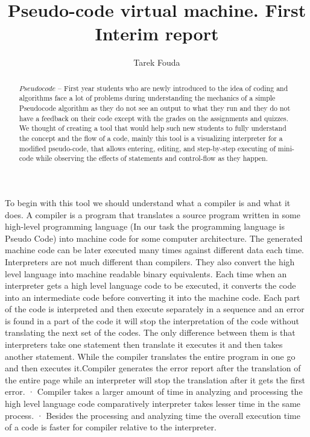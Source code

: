 \documentclass[a4paper]{article}
\author{Tarek Fouda}
\title{Pseudo-code virtual machine. First Interim report}
\begin{document}
\maketitle

\begin{abstract}
  $ Pseudo code $ -- First year students who are newly introduced to the idea of coding and algorithms face a lot of problems during understanding the mechanics of a simple Pseudocode algorithm as they do not see an output to what they run and they do not have a feedback on their code except with the grades on the assignments and quizzes. We thought of creating a tool that would help such new students to fully understand the concept and the flow of a code, mainly this tool is a visualizing interpreter for a modified pseudo-code, that allows entering, editing, and step-by-step executing of mini-code while observing the effects of statements and control-flow as they happen.
  
  
  \end{abstract}
  \bigskip
  \bigskip
  

To begin with this tool we should understand what a compiler is and what it does. A compiler is a program that translates a source program written in some high-level programming language (In our task the programming language is Pseudo Code) into machine code for some computer architecture. The generated machine code can be later executed many times against different data each time. Interpreters are not much different than compilers. They also convert the high level language into machine readable binary equivalents. Each time when an interpreter gets a high level language code to be executed, it converts the code into an intermediate code before converting it into the machine code. Each part of the code is interpreted and then execute separately in a sequence and an error is found in a part of the code it will stop the interpretation of the code without translating the next set of the codes. The only difference between them is that interpreters take one statement then translate it executes it and then takes another statement. While the compiler translates the entire program in one go and then executes it.Compiler generates the error report after the translation of the entire page while an interpreter will stop the translation after it gets the first error.
·         Compiler takes a larger amount of time in analyzing and processing the high level language code comparatively interpreter takes lesser time in the same process.
·         Besides the processing and analyzing time the overall execution time of a code is faster for compiler relative to the interpreter.
\end{document}
